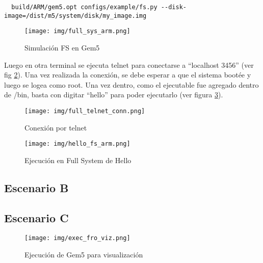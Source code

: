 \documentclass {article}
\begin{document}
\begin{lstlisting}
  build/ARM/gem5.opt configs/example/fs.py --disk-image=/dist/m5/system/disk/my_image.img
\end{lstlisting}

\begin{figure}[H]
  \centering
  \texttt{[image: img/full\_sys\_arm.png]}
  \caption{\label{fig:arm_full_gem5} Simulación FS en Gem5}
\end{figure}

Luego en otra terminal se ejecuta telnet para conectarse a ``localhost 3456'' (ver fig
\ref{fig:telnet}). Una vez realizada la
conexión, se debe esperar a que el sistema bootée y luego se logea como root. Una vez dentro, como
el ejecutable fue agregado dentro de /bin, basta con digitar ``hello'' para poder ejecutarlo (ver
figura \ref{fig:hello_fs}).

\begin{figure}[H]
  \centering
  \texttt{[image: img/full\_telnet\_conn.png]}
  \caption{\label{fig:telnet} Conexión por telnet}
\end{figure}

\begin{figure}[H]
  \centering
  \texttt{[image: img/hello\_fs\_arm.png]}
  \caption{\label{fig:hello_fs} Ejecución en Full System de Hello}
\end{figure}

\subsection{Escenario B}

\subsection{Escenario C}


\begin{figure}[ht]
  \centering
  \texttt{[image: img/exec\_fro\_viz.png]}
  \caption{\label{fig:exec_for_viz} Ejecución de Gem5 para visualización}
\end{figure}
\end{document}
